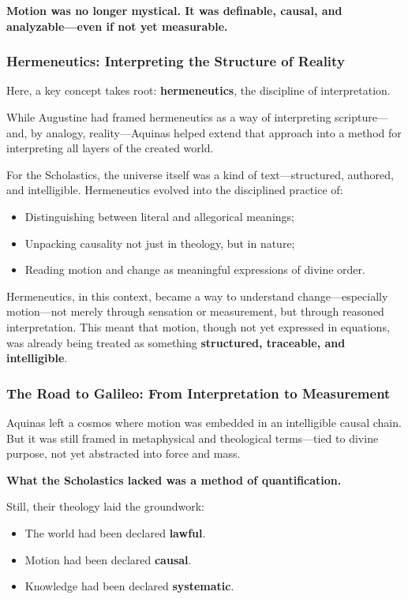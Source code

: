 \textbf{Motion was no longer mystical. It was definable, causal, and analyzable—even if not yet measurable.}

\subsubsection*{Hermeneutics: Interpreting the Structure of Reality}

Here, a key concept takes root: \textbf{hermeneutics}, the discipline of interpretation.

While Augustine had framed hermeneutics as a way of interpreting scripture—and, by analogy, reality—Aquinas helped extend that approach into a method for interpreting all layers of the created world.  

For the Scholastics, the universe itself was a kind of text—structured, authored, and intelligible. Hermeneutics evolved into the disciplined practice of:

\begin{itemize}
    \item Distinguishing between literal and allegorical meanings;
    \item Unpacking causality not just in theology, but in nature;
    \item Reading motion and change as meaningful expressions of divine order.
\end{itemize}

Hermeneutics, in this context, became a way to understand change—especially motion—not merely through sensation or measurement, but through reasoned interpretation. This meant that motion, though not yet expressed in equations, was already being treated as something \textbf{structured, traceable, and intelligible}.

\subsubsection*{The Road to Galileo: From Interpretation to Measurement}

Aquinas left a cosmos where motion was embedded in an intelligible causal chain. But it was still framed in metaphysical and theological terms—tied to divine purpose, not yet abstracted into force and mass.

\textbf{What the Scholastics lacked was a method of quantification.}

Still, their theology laid the groundwork:

\begin{itemize}
    \item The world had been declared \textbf{lawful}.
    \item Motion had been declared \textbf{causal}.
    \item Knowledge had been declared \textbf{systematic}.
\end{itemize}

